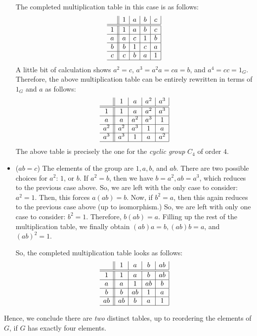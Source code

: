 \begin{xca}
\begin{itemize}
    The completed multiplication table in this case is as follows:
    \[
    \begin{array}{c || c | c | c | c |}
          & 1 & a & b & c \\
        \hline \hline
        1 & 1 & a & b & c \\
        \hline
        a & a & c & 1 & b \\
        \hline
        b & b & 1 & c & a \\
        \hline
        c & c & b & a & 1 \\
        \hline
    \end{array}
    \]
    A little bit of calculation shows $a^2 = c$, $a^3 = a^2 a = ca = b$, and
    $a^4 = cc = 1_G$. Therefore, the above multiplication table can be entirely
    rewritten in terms of $1_G$ and $a$ as follows:
    \[
    \begin{array}{c || c | c | c | c |}
            & 1   & a   & a^2 & a^3 \\
        \hline \hline
        1   & 1   & a   & a^2 & a^3 \\
        \hline
        a   & a   & a^2 & a^3 & 1 \\
        \hline
        a^2 & a^2 & a^3 & 1   & a \\
        \hline
        a^3 & a^3 & 1   & a   & a^2 \\
        \hline
    \end{array}
    \]
    The above table is precisely the one for the \emph{cyclic group} $C_4$ of
    order $4$.

    \item ($ab = c$) The elements of the group are $1, a, b$, and $ab$. There
    are two possible choices for $a^2$: $1$, or $b$. If $a^2 = b$, then we
    have $b = a^2, ab = a^3$, which reduces to the previous case above. So, we
    are left with the only case to consider: $a^2 = 1$. Then, this forces
    $a(ab) = b$. Now, if $b^2 = a$, then this again reduces to the previous
    case above (up to isomorphism.) So, we are left with only one case to
    consider: $b^2 = 1$. Therefore, $b(ab) = a$. Filling up the rest of the
    multiplication table, we finally obtain $(ab)a = b, (ab)b = a$, and $(ab)^2
    = 1$.

    So, the completed multiplication table looks as follows:
    \[
    \begin{array}{c || c | c | c | c |}
           & 1  & a  & b  & ab \\
        \hline \hline
        1  & 1  & a  & b  & ab \\
        \hline
        a  & a  & 1  & ab & b \\
        \hline
        b  & b  & ab & 1  & a \\
        \hline
        ab & ab & b  & a  & 1 \\
        \hline
    \end{array}
    \]
\end{itemize}
Hence, we conclude there are \emph{two} distinct tables, up to reordering the
elements of $G$, if $G$ has exactly four elements.


\end{xca}

